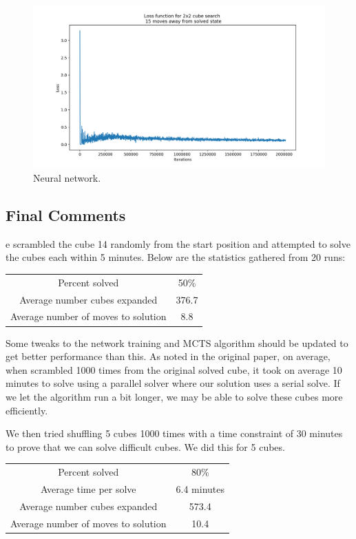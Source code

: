 \documentclass[10pt,twocolumn,letterpaper]{article}
\begin{document}
\begin{figure}
  \includegraphics[width=\linewidth]{loss.png}
  \caption{Neural network.}
  \label{fig:net}
\end{figure}

\subsection{Final Comments}
e scrambled the cube 14 randomly from the start position and attempted to solve the cubes each within 5 minutes. Below are the statistics gathered from 20 runs:

\begin{center}
	\begin{tabular}{ |c|c| } 
		 \hline
		  Percent solved & 50\%\\ 
		   Average number cubes expanded & 376.7  \\ 
		    Average number of moves to solution & 8.8 \\ 
		     \hline
	\end{tabular}
\end{center}

Some tweaks to the network training and MCTS algorithm should be updated to get better performance than this. As noted in the original paper, on average, when scrambled 1000 times from the original solved cube, it took on average 10 minutes to solve using a parallel solver where our solution uses a serial solve. If we let the algorithm run a bit longer, we may be able to solve these cubes more efficiently. 

We then tried shuffling 5 cubes 1000 times with a time constraint of 30 minutes to prove that we can solve difficult cubes. We did this for 5 cubes.

\begin{center}
	\begin{tabular}{ |c|c| } 
		 \hline
		  Percent solved & 80\%\\ 
		   Average time per solve & 6.4 minutes \\
		    Average number cubes expanded & 573.4  \\ 
		     Average number of moves to solution & 10.4 \\ 
		      \hline
	\end{tabular}
\end{center}
\end{document}
